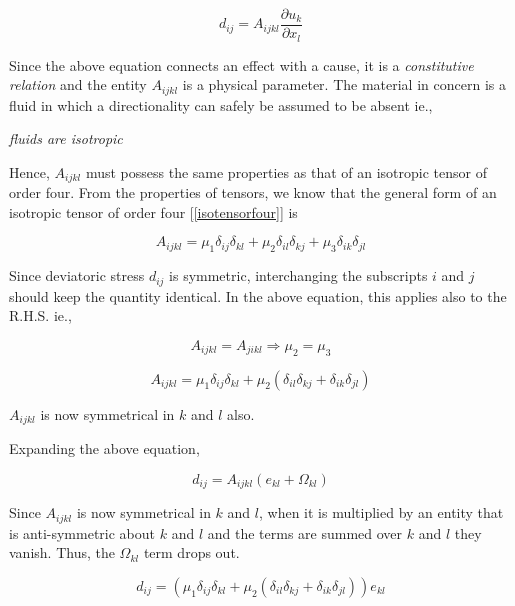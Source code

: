 \begin{equation}
d_{ij} = A_{ijkl} \frac{\partial u_k}{\partial x_l}
\end{equation} 

Since the above equation connects an effect with a cause, it is a {\em constitutive relation}
and the entity $A_{ijkl}$ is a physical parameter. The material in concern is a fluid in which a directionality can safely be assumed to be absent ie., 

\begin{center}
{\em fluids are isotropic}
\end{center}

 Hence, $A_{ijkl}$ must possess the same properties as that of an isotropic tensor of order four. From the properties of tensors, we know that the general form of an isotropic tensor of order four [\ref{isotensorfour}] is 

\begin{equation}
A_{ijkl} = \mu_1 \delta_{ij}\delta_{kl} + \mu_2 \delta_{il}\delta_{kj} + \mu_3 \delta_{ik}\delta_{jl}
\end{equation} 

Since deviatoric stress $d_{ij}$ is symmetric, interchanging the subscripts $i$ and $j$ should keep the quantity identical. In the above equation, this applies also to the R.H.S. ie.,

\begin{equation}
A_{ijkl} = A_{jikl} \Rightarrow \mu_2 = \mu_3
\end{equation} 

\begin{equation}
A_{ijkl} = \mu_1 \delta_{ij}\delta_{kl} + \mu_2 \left( \delta_{il}\delta_{kj} + \delta_{ik}\delta_{jl} \right)
\end{equation} 

$A_{ijkl}$ is now symmetrical in $k$ and $l$ also.

Expanding the above equation,

\begin{equation}
d_{ij} = A_{ijkl} \left( e_{kl} + \Omega_{kl} \right)
\end{equation} 

Since $A_{ijkl}$ is now symmetrical in $k$ and $l$, when it is multiplied by an entity that is anti-symmetric about $k$ and $l$ and the terms are summed over $k$ and $l$ they vanish. Thus, the $\Omega_{kl}$ term drops out.

\begin{equation}
d_{ij} = \left( \mu_1 \delta_{ij}\delta_{kl} + \mu_2 \left( \delta_{il}\delta_{kj} + \delta_{ik}\delta_{jl} \right) \right) e_{kl}
\end{equation} 

